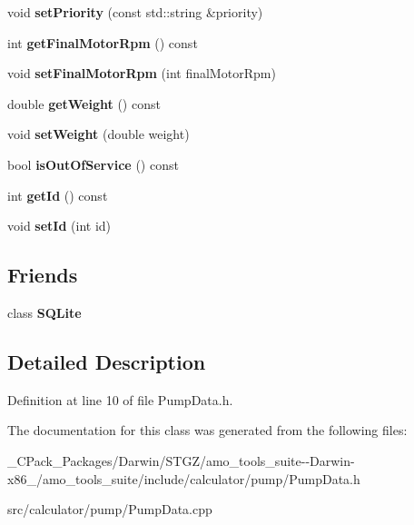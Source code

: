 \begin{DoxyCompactItemize}
\item 
\mbox{\label{class_pump_data_aea2420ebfa204d0bbda6f322729c11c3}} 
void {\bfseries set\+Priority} (const std\+::string \&priority)
\item 
\mbox{\label{class_pump_data_ace9256fdd3afebb9f2f8647234f7f9af}} 
int {\bfseries get\+Final\+Motor\+Rpm} () const
\item 
\mbox{\label{class_pump_data_a74de5295a37ed747c8bb0ba95271b536}} 
void {\bfseries set\+Final\+Motor\+Rpm} (int final\+Motor\+Rpm)
\item 
\mbox{\label{class_pump_data_a2e6aa462389c9319292ef4002674d009}} 
double {\bfseries get\+Weight} () const
\item 
\mbox{\label{class_pump_data_a5cc20c9d33c7000da4cf15ee8b857504}} 
void {\bfseries set\+Weight} (double weight)
\item 
\mbox{\label{class_pump_data_a638acde0858b29b9a086cf4cc6e4f73f}} 
bool {\bfseries is\+Out\+Of\+Service} () const
\item 
\mbox{\label{class_pump_data_ac7e900bf6d6ebdffb375b4d913ae6a06}} 
int {\bfseries get\+Id} () const
\item 
\mbox{\label{class_pump_data_a99da1d2ca8416ecbf85fe662ff97db45}} 
void {\bfseries set\+Id} (int id)
\end{DoxyCompactItemize}
\subsection*{Friends}
\begin{DoxyCompactItemize}
\item 
\mbox{\label{class_pump_data_a0102f3b3c0cbf96db6c49f071fa5e7cc}} 
class {\bfseries S\+Q\+Lite}
\end{DoxyCompactItemize}


\subsection{Detailed Description}


Definition at line 10 of file Pump\+Data.\+h.



The documentation for this class was generated from the following files\+:\begin{DoxyCompactItemize}
\item 
\+\_\+\+C\+Pack\+\_\+\+Packages/\+Darwin/\+S\+T\+G\+Z/amo\+\_\+tools\+\_\+suite-\/-\/\+Darwin-\/x86\+\_/amo\+\_\+tools\+\_\+suite/include/calculator/pump/Pump\+Data.\+h\item 
src/calculator/pump/Pump\+Data.\+cpp\end{DoxyCompactItemize}
